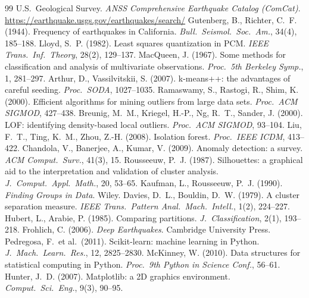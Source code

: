 \documentclass[10.5pt,a4paper]{article}
\begin{document}
\begin{thebibliography}{99}\footnotesize
\setlength{\itemsep}{0pt}
 U.S.\ Geological Survey. \emph{ANSS Comprehensive Earthquake Catalog (ComCat)}. \url{https://earthquake.usgs.gov/earthquakes/search/}
 Gutenberg, B., Richter, C.\ F. (1944). Frequency of earthquakes in California. \emph{Bull.\ Seismol.\ Soc.\ Am.}, 34(4), 185--188.
 Lloyd, S.\ P. (1982). Least squares quantization in PCM. \emph{IEEE Trans.\ Inf.\ Theory}, 28(2), 129--137.
 MacQueen, J. (1967). Some methods for classification and analysis of multivariate observations. \emph{Proc.\ 5th Berkeley Symp.}, 1, 281--297.
 Arthur, D., Vassilvitskii, S. (2007). k-means++: the advantages of careful seeding. \emph{Proc.\ SODA}, 1027--1035.
 Ramaswamy, S., Rastogi, R., Shim, K. (2000). Efficient algorithms for mining outliers from large data sets. \emph{Proc.\ ACM SIGMOD}, 427--438.
 Breunig, M.\ M., Kriegel, H.-P., Ng, R.\ T., Sander, J. (2000). LOF: identifying density-based local outliers. \emph{Proc.\ ACM SIGMOD}, 93--104.
 Liu, F.\ T., Ting, K.\ M., Zhou, Z.-H. (2008). Isolation forest. \emph{Proc.\ IEEE ICDM}, 413--422.
 Chandola, V., Banerjee, A., Kumar, V. (2009). Anomaly detection: a survey. \emph{ACM Comput.\ Surv.}, 41(3), 15.
 Rousseeuw, P.\ J. (1987). Silhouettes: a graphical aid to the interpretation and validation of cluster analysis. \emph{J.\ Comput.\ Appl.\ Math.}, 20, 53--65.
 Kaufman, L., Rousseeuw, P.\ J. (1990). \emph{Finding Groups in Data}. Wiley.
 Davies, D.\ L., Bouldin, D.\ W. (1979). A cluster separation measure. \emph{IEEE Trans.\ Pattern Anal.\ Mach.\ Intell.}, 1(2), 224--227.
 Hubert, L., Arabie, P. (1985). Comparing partitions. \emph{J.\ Classification}, 2(1), 193--218.
 Frohlich, C. (2006). \emph{Deep Earthquakes}. Cambridge University Press.
 Pedregosa, F.\ et al.\ (2011). Scikit-learn: machine learning in Python. \emph{J.\ Mach.\ Learn.\ Res.}, 12, 2825--2830.
 McKinney, W. (2010). Data structures for statistical computing in Python. \emph{Proc.\ 9th Python in Science Conf.}, 56--61.
 Hunter, J.\ D. (2007). Matplotlib: a 2D graphics environment. \emph{Comput.\ Sci.\ Eng.}, 9(3), 90--95.
\end{thebibliography}
\end{document}
